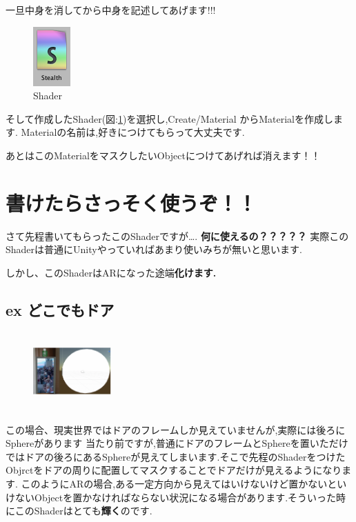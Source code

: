 一旦中身を消してから中身を記述してあげます!!!
\begin{figure}[htbp]
\centering
\includegraphics[]{./assets/yuhiasset/hsau_dosei1.png}
\caption{Shader}
\label{fig:shader}
\end{figure}
そして作成したShader(図:\ref{fig:shader})を選択し,Create/Material からMaterialを作成します.
Materialの名前は,好きにつけてもらって大丈夫です.

あとはこのMaterialをマスクしたいObjectにつけてあげれば消えます！！

\section{書けたらさっそく使うぞ！！}
さて先程書いてもらったこのShaderですが….
{\bf 何に使えるの？？？？？}
実際このShaderは普通にUnityやっていればあまり使いみちが無いと思います.

しかし、このShaderはARになった途端\bf{化けます}.

\subsection{ex どこでもドア}
\begin{figure}[htbp]
\centering
\includegraphics[width=3cm,height=3cm]{./assets/yuhiasset/hsau_dosei3.png}
\end{figure}
この場合、現実世界ではドアのフレームしか見えていませんが,実際には後ろにSphereがあります
当たり前ですが,普通にドアのフレームとSphereを置いただけではドアの後ろにあるSphereが見えてしまいます.そこで先程のShaderをつけたObjrctをドアの周りに配置してマスクすることでドアだけが見えるようになります.
このようにARの場合,ある一定方向から見えてはいけないけど置かないといけないObjectを置かなければならない状況になる場合があります.そういった時にこのShaderはとても{\bf 輝く}のです.

